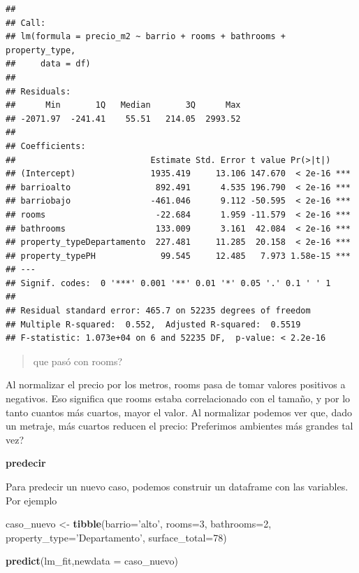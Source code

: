 \documentclass[]{book}
\newenvironment{Shaded}{\begin{snugshade}}{\end{snugshade}}
\newcommand{\DataTypeTok}[1]{\textcolor[rgb]{0.13,0.29,0.53}{#1}}
\newcommand{\DecValTok}[1]{\textcolor[rgb]{0.00,0.00,0.81}{#1}}
\newcommand{\KeywordTok}[1]{\textcolor[rgb]{0.13,0.29,0.53}{\textbf{#1}}}
\newcommand{\NormalTok}[1]{#1}
\newcommand{\StringTok}[1]{\textcolor[rgb]{0.31,0.60,0.02}{#1}}
\begin{document}
\begin{verbatim}
## 
## Call:
## lm(formula = precio_m2 ~ barrio + rooms + bathrooms + property_type, 
##     data = df)
## 
## Residuals:
##      Min       1Q   Median       3Q      Max 
## -2071.97  -241.41    55.51   214.05  2993.52 
## 
## Coefficients:
##                           Estimate Std. Error t value Pr(>|t|)    
## (Intercept)               1935.419     13.106 147.670  < 2e-16 ***
## barrioalto                 892.491      4.535 196.790  < 2e-16 ***
## barriobajo                -461.046      9.112 -50.595  < 2e-16 ***
## rooms                      -22.684      1.959 -11.579  < 2e-16 ***
## bathrooms                  133.009      3.161  42.084  < 2e-16 ***
## property_typeDepartamento  227.481     11.285  20.158  < 2e-16 ***
## property_typePH             99.545     12.485   7.973 1.58e-15 ***
## ---
## Signif. codes:  0 '***' 0.001 '**' 0.01 '*' 0.05 '.' 0.1 ' ' 1
## 
## Residual standard error: 465.7 on 52235 degrees of freedom
## Multiple R-squared:  0.552,  Adjusted R-squared:  0.5519 
## F-statistic: 1.073e+04 on 6 and 52235 DF,  p-value: < 2.2e-16
\end{verbatim}

\begin{quote}
que pasó con rooms?
\end{quote}

Al normalizar el precio por los metros, rooms pasa de tomar valores positivos a negativos. Eso significa que rooms estaba correlacionado con el tamaño, y por lo tanto cuantos más cuartos, mayor el valor. Al normalizar podemos ver que, dado un metraje, más cuartos reducen el precio: Preferimos ambientes más grandes tal vez?

\textbf{predecir}

Para predecir un nuevo caso, podemos construir un dataframe con las variables. Por ejemplo

\begin{Shaded}
\begin{Highlighting}[]
\NormalTok{caso_nuevo <-}\StringTok{ }\KeywordTok{tibble}\NormalTok{(}\DataTypeTok{barrio=}\StringTok{'alto'}\NormalTok{,}
       \DataTypeTok{rooms=}\DecValTok{3}\NormalTok{,}
       \DataTypeTok{bathrooms=}\DecValTok{2}\NormalTok{,}
       \DataTypeTok{property_type=}\StringTok{'Departamento'}\NormalTok{,}
       \DataTypeTok{surface_total=}\DecValTok{78}\NormalTok{) }

\KeywordTok{predict}\NormalTok{(lm_fit,}\DataTypeTok{newdata =}\NormalTok{ caso_nuevo)}
\end{Highlighting}
\end{Shaded}
\end{document}
